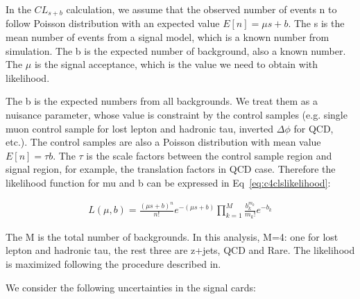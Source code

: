 In the $CL_{s+b}$ calculation, we assume that the observed number of events n to follow Poisson distribution with an expected value $E[n]=\mu s+b$. The s is the mean number of events from a signal model, which is a known number from simulation. The b is the expected number of background, also a known number. The $\mu$ is the signal acceptance, which is the value we need to obtain with likelihood. 

The b is the expected numbers from all backgrounds. We treat them as a nuisance parameter, whose value is constraint by the control samples (e.g. single muon control sample for lost lepton and hadronic tau, inverted $\Delta \phi$ for QCD, etc.). The control samples are also a Poisson distribution with mean value $E[n]=\tau b$. The $\tau$ is the scale factors between the control sample region and signal region, for example, the translation factors in QCD case. Therefore the likelihood function for mu and b can be expressed in Eq~\ref{eq:c4clslikelihood}:

\begin{equation}
 \begin{aligned}
  L(\mu,b)= \frac{(\mu s+b)^{n}}{n!}e^{-(\mu s+b)} \prod_{k=1}^{M}\frac{b_{k}^{m_{k}}}{m_{k}!}e^{-b_{k}}
 \end{aligned}
 \label{eq:c4clslikelihood}
\end{equation}

The M is the total number of backgrounds. In this analysis, M=4: one for lost lepton and hadronic tau, the rest three are z+jets, QCD and Rare. The likelihood is maximized following the procedure described in\cite{Cowan:2010js}.

We consider the following uncertainties in the signal cards: 

